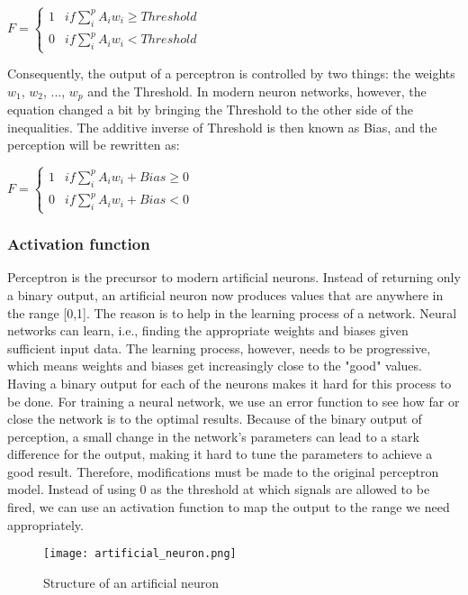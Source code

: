\begin{center}
$F = \begin{cases}
1 & if \sum_{i}^{p} A_i w_i \geq Threshold \\
0 & if \sum_{i}^{p} A_i w_i < Threshold
\end{cases}$
\end{center}

Consequently, the output of a perceptron is controlled by two things: the weights $w_1$, $w_2$, ..., $w_p$ and the Threshold. In modern neuron networks, however, the equation changed a bit by bringing the Threshold to the other side of the inequalities. The additive inverse of Threshold is then known as Bias, and the perception will be rewritten as:

\begin{center}
$F = \begin{cases}
1 & if \sum_{i}^{p} A_i w_i + Bias \geq 0 \\
0 & if \sum_{i}^{p} A_i w_i + Bias < 0
\end{cases}$
\end{center}

\subsubsection{Activation function}

Perceptron is the precursor to modern artificial neurons. Instead of returning only a binary output, an artificial neuron now produces values that are anywhere in the range [0,1]. The reason is to help in the learning process of a network. Neural networks can learn, i.e., finding the appropriate weights and biases given sufficient input data. The learning process, however, needs to be progressive, which means weights and biases get increasingly close to the "good" values. Having a binary output for each of the neurons makes it hard for this process to be done. For training a neural network, we use an error function to see how far or close the network is to the optimal results. Because of the binary output of perception, a small change in the network's parameters can lead to a stark difference for the output, making it hard to tune the parameters to achieve a good result. Therefore, modifications must be made to the original perceptron model. Instead of using 0 as the threshold at which signals are allowed to be fired, we can use an activation function to map the output to the range we need appropriately.

\begin{figure}[htbp!] 
\centering    
\texttt{[image: artificial\_neuron.png]}
\caption{Structure of an artificial neuron \cite{wikian}}
\label{fig:artificial-neuron}
\end{figure}

